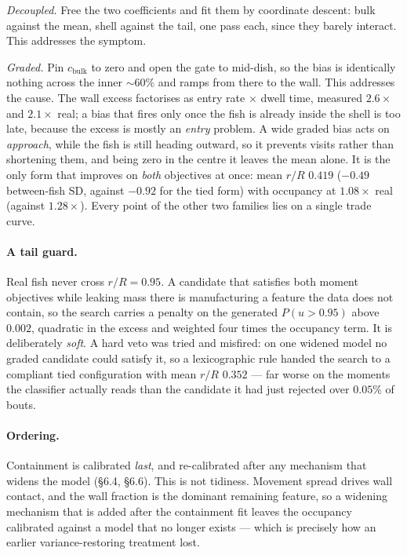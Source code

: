 \emph{Decoupled.} Free the two coefficients and fit them by coordinate descent: bulk against the
mean, shell against the tail, one pass each, since they barely interact. This addresses the
symptom.

\emph{Graded.} Pin $c_{\text{bulk}}$ to zero and open the gate to mid-dish, so the bias is
identically nothing across the inner ${\sim}60\%$ and ramps from there to the wall. This addresses
the cause. The wall excess factorises as entry rate $\times$ dwell time, measured $2.6\times$ and
$2.1\times$ real; a bias that fires only once the fish is already inside the shell is too late,
because the excess is mostly an \emph{entry} problem. A wide graded bias acts on \emph{approach},
while the fish is still heading outward, so it prevents visits rather than shortening them, and
being zero in the centre it leaves the mean alone. It is the only form that improves on \emph{both}
objectives at once: mean $r/R$ $0.419$ ($-0.49$ between-fish SD, against $-0.92$ for the tied form)
with occupancy at $1.08\times$ real (against $1.28\times$). Every point of the other two families
lies on a single trade curve.

\paragraph{A tail guard.} Real fish never cross $r/R=0.95$. A candidate that satisfies both moment
objectives while leaking mass there is manufacturing a feature the data does not contain, so the
search carries a penalty on the generated $P(u>0.95)$ above $0.002$, quadratic in the excess and
weighted four times the occupancy term. It is deliberately \emph{soft}. A hard veto was tried and
misfired: on one widened model no graded candidate could satisfy it, so a lexicographic rule handed
the search to a compliant tied configuration with mean $r/R$ $0.352$ --- far worse on the moments
the classifier actually reads than the candidate it had just rejected over $0.05\%$ of bouts.

\paragraph{Ordering.} Containment is calibrated \emph{last}, and re-calibrated after any mechanism
that widens the model (\S6.4, \S6.6). This is not tidiness. Movement spread drives wall contact,
and the wall fraction is the dominant remaining feature, so a widening mechanism that is added
after the containment fit leaves the occupancy calibrated against a model that no longer exists ---
which is precisely how an earlier variance-restoring treatment lost.

